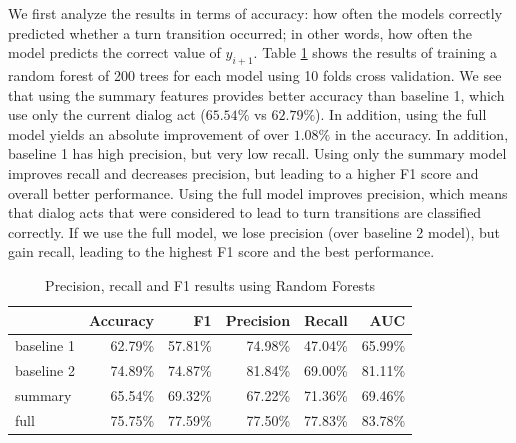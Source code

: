 We first analyze the results in terms of accuracy: how often the models correctly predicted whether a turn transition occurred; in other words, how often the model predicts the correct value of $y_{i+1}$.
%
Table \ref{table:result} shows the results of training a random forest of 200 trees for each model using 10 folds cross validation. We see that using the summary features provides better accuracy than baseline 1, which use only the current dialog act ($65.54\%$ vs $62.79\%$). In addition, using the full model yields an absolute improvement of over $1.08\%$ in the accuracy. In addition, baseline 1 has high precision, but very low recall. Using only the summary model improves recall and decreases precision, but leading to a higher F1 score and overall better performance. Using the full model improves precision, which means that dialog acts that were considered to lead to turn transitions are classified correctly. If we use the full model, we lose precision (over baseline 2 model), but gain recall,
leading to the highest F1 score and the best performance.
%
\begin{table}[ht!]
\begin{center}
\begin{tabular}{lrrrrr}
\toprule
{} &  Accuracy &        F1 &  Precision &    Recall &   AUC \\
\midrule
baseline 1 &  62.79\% &  57.81\% &   74.98\% &  47.04\% &  65.99\% \\
baseline 2 &  74.89\% &  74.87\% &   81.84\% &  69.00\% &  81.11\% \\
summary    &  65.54\% &  69.32\% &   67.22\% &  71.36\% &  69.46\% \\
full       &  75.75\% &  77.59\% &   77.50\% &  77.83\% &  83.78\% \\
\bottomrule
\end{tabular}
\end{center}
\caption{Precision, recall and F1 results using Random Forests }
\label{table:result}
\end{table}


